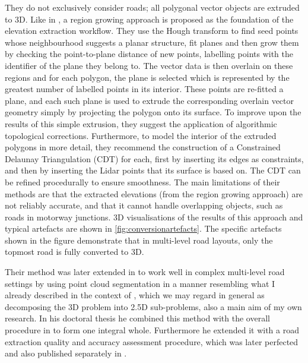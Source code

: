 They do not exclusively consider roads; all polygonal vector objects are extruded to 3D. Like in \cite{hatger_brenner_2003}, a region growing approach is proposed as the foundation of the elevation extraction workflow. They use the Hough transform to find seed points whose neighbourhood suggests a planar structure, fit planes and then grow them by checking the point-to-plane distance of new points, labelling points with the identifier of the plane they belong to. The vector data is then overlain on these regions and for each polygon, the plane is selected which is represented by the greatest number of labelled points in its interior. These points are re-fitted a plane, and each such plane is used to extrude the corresponding overlain vector geometry simply by projecting the polygon onto its surface. To improve upon the results of this simple extrusion, they suggest the application of algorithmic topological corrections. Furthermore, to model the interior of the extruded polygons in more detail, they recommend the construction of a Constrained Delaunay Triangulation (CDT) for each, first by inserting its edges as constraints, and then by inserting the Lidar points that its surface is based on. The CDT can be refined procedurally to ensure smoothness. The main limitations of their methods are that the extracted elevations (from the region growing approach) are not reliably accurate, and that it cannot handle overlapping objects, such as roads in motorway junctions. 3D visualisations of the results of this approach and typical artefacts are shown in \ref{fig:conversionartefacts}. The specific artefacts shown in the figure demonstrate that in multi-level road layouts, only the topmost road is fully converted to 3D.

Their method was later extended in \cite{oudeElberink_vosselman_2009} to work well in complex multi-level road settings by using point cloud segmentation in a manner resembling what I already described in the context of \cite{boyko_funkhauser_2011}, which we may regard in general as decomposing the 3D problem into 2.5D sub-problems, also a main aim of my own research. In his doctoral thesis \cite{oudeElberink_2010} he combined this method with the overall procedure in \cite{oudeElberink_vosselman_2006} to form one integral whole. Furthermore he extended it with a road extraction quality and accuracy assessment procedure, which was later perfected and also published separately in \cite{oudeElberink_vosselman_2012}.

